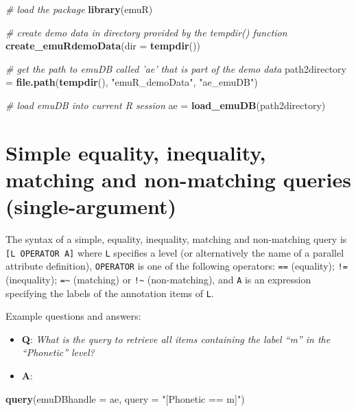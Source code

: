 \documentclass[]{book}
\newenvironment{Shaded}{\begin{snugshade}}{\end{snugshade}}
\newcommand{\CommentTok}[1]{\textcolor[rgb]{0.56,0.35,0.01}{\textit{#1}}}
\newcommand{\DataTypeTok}[1]{\textcolor[rgb]{0.13,0.29,0.53}{#1}}
\newcommand{\KeywordTok}[1]{\textcolor[rgb]{0.13,0.29,0.53}{\textbf{#1}}}
\newcommand{\NormalTok}[1]{#1}
\newcommand{\StringTok}[1]{\textcolor[rgb]{0.31,0.60,0.02}{#1}}
\providecommand{\tightlist}{%
  \setlength{\itemsep}{0pt}\setlength{\parskip}{0pt}}
\theoremstyle{definition}
\theoremstyle{definition}
\theoremstyle{definition}
\theoremstyle{remark}
\begin{document}
\begin{Shaded}
\begin{Highlighting}[]
\CommentTok{# load the package }
\KeywordTok{library}\NormalTok{(emuR)}

\CommentTok{# create demo data in directory provided by the tempdir() function}
\KeywordTok{create_emuRdemoData}\NormalTok{(}\DataTypeTok{dir =} \KeywordTok{tempdir}\NormalTok{())}

\CommentTok{# get the path to emuDB called 'ae' that is part of the demo data}
\NormalTok{path2directory =}\StringTok{ }\KeywordTok{file.path}\NormalTok{(}\KeywordTok{tempdir}\NormalTok{(), }\StringTok{"emuR_demoData"}\NormalTok{, }\StringTok{"ae_emuDB"}\NormalTok{)}

\CommentTok{# load emuDB into current R session}
\NormalTok{ae =}\StringTok{ }\KeywordTok{load_emuDB}\NormalTok{(path2directory)}
\end{Highlighting}
\end{Shaded}

\hypertarget{simple-equality-inequality-matching-non-matching-queries-single-argument}{%
\section{Simple equality, inequality, matching and non-matching queries
(single-argument)}\label{simple-equality-inequality-matching-non-matching-queries-single-argument}}

The syntax of a simple, equality, inequality, matching and non-matching
query is \texttt{{[}L\ OPERATOR\ A{]}} where \texttt{L} specifies a
level (or alternatively the name of a parallel attribute definition),
\texttt{OPERATOR} is one of the following operators: \texttt{==}
(equality); \texttt{!=} (inequality); \texttt{=\textasciitilde{}}
(matching) or \texttt{!\textasciitilde{}} (non-matching), and \texttt{A}
is an expression specifying the labels of the annotation items of
\texttt{L}.

Example questions and answers:

\begin{itemize}
\tightlist
\item
  \textbf{Q}: \emph{What is the query to retrieve all items containing
  the label ``m'' in the ``Phonetic'' level?}
\item
  \textbf{A}:
\end{itemize}

\begin{Shaded}
\begin{Highlighting}[]
\KeywordTok{query}\NormalTok{(}\DataTypeTok{emuDBhandle =}\NormalTok{ ae, }
      \DataTypeTok{query =} \StringTok{"[Phonetic == m]"}\NormalTok{)}
\end{Highlighting}
\end{Shaded}
\end{document}
